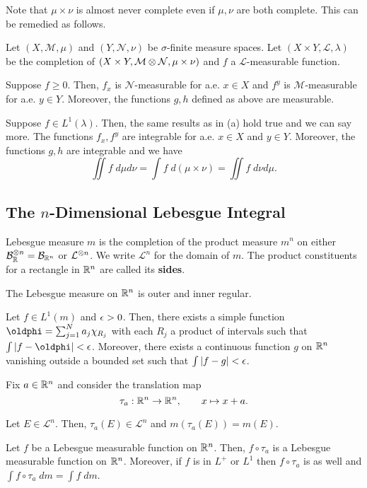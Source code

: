 \documentclass[11pt]{article}
\newcommand{\B}{\mathcal{B}}
\renewcommand{\L}{\mathcal{L}}
\newcommand{\M}{\mathcal{M}}
\renewcommand{\N}{\mathcal{N}}
\renewcommand{\phi}{\oldphi}
\begin{document}
Note that $\mu\times\nu$ is almost never complete even if $\mu,\nu$ are both complete. This can be remedied as follows.

\begin{theorem}
Let $(X,\M,\mu)$ and $(Y,\N,\nu)$ be $\sigma$-finite measure spaces. Let $(X\times Y,\L,\lambda)$ be the completion of $(X\times Y,\M\tensor\N,\mu\times\nu)$ and $f$ a $\L$-measurable function.
\begin{enum}{\alph}
\item Suppose $f\geq0$. Then, $f_x$ is $\N$-measurable for a.e. $x\in X$ and $f^y$ is $\M$-measurable for a.e. $y\in Y$. Moreover, the functions $g,h$ defined as above are measurable.

\item Suppose $f\in L^1(\lambda)$. Then, the same results as in \textup{(a)} hold true and we can say more. The functions $f_x,f^y$ are integrable for a.e. $x\in X$ and $y\in Y$. Moreover, the functions $g,h$ are integrable and we have
$$\iint f\;d\mu d\nu=\int f\;d(\mu\times\nu)=\iint f\;d\nu d\mu.$$
\end{enum}
\end{theorem}

\subsection{The $n$-Dimensional Lebesgue Integral}
Lebesgue measure $m$ is the completion of the product measure $m^n$ on either $\B_{\R}^{\tensor n}=\B_{\R^n}$ or $\L^{\tensor n}$. We write $\L^n$ for the domain of $m$. The product constituents for a rectangle in $\mathbb{R}^n$ are called its \textbf{sides}.

\begin{theorem}
The Lebesgue measure on $\mathbb{R}^n$ is outer and inner regular.
\end{theorem}

\begin{theorem}
Let $f\in L^1(m)$ and $\epsilon>0$. Then, there exists a simple function $\phi=\sum_{j=1}^Na_j\chi_{R_j}$ with each $R_j$ a product of intervals such that $\int|f-\phi|<\eps$. Moreover, there exists a continuous function $g$ on $\mathbb{R}^n$ vanishing outside a bounded set such that $\int|f-g|<\epsilon$.
\end{theorem}

\begin{theorem}
Fix $a\in\mathbb{R}^n$ and consider the translation map 
$$\tau_a: \mathbb{R}^n\to\mathbb{R}^n,\qquad x\mapsto x+a.$$
\begin{enum}{\alph}
\item Let $E\in\L^n$. Then, $\tau_a(E)\in\L^n$ and $m(\tau_a(E))=m(E)$.
\item Let $f$ be a Lebesgue measurable function on $\mathbb{R}^n$. Then, $f\circ\tau_a$ is a Lebesgue measurable function on $\mathbb{R}^n$. Moreover, if $f$ is in $L^+$ or $L^1$ then $f\circ\tau_a$ is as well and $\int f\circ\tau_a\;dm=\int f\;dm$.
\end{enum}
\end{theorem}
\end{document}
